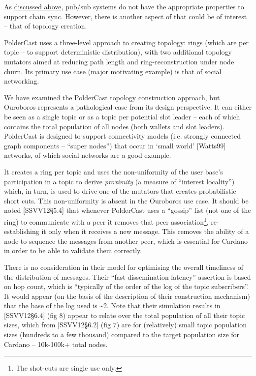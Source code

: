 \documentclass[]{article}
\begin{document}
As \protect\hyperlink{dpbtiakzv0oy}{{discussed above}}, pub/sub systems
do not have the appropriate properties to support chain sync. However,
there is another aspect of that could be of interest -- that of topology
creation.

PolderCast uses a three-level approach to creating topology: rings
(which are per topic -- to support deterministic distribution), with two
additional topology mutators aimed at reducing path length and
ring-reconstruction under node churn. Its primary use case (major
motivating example) is that of social networking.

We have examined the PolderCast topology construction approach, but
Ouroboros represents a pathological case from its design perspective. It
can either be seen as a single topic or as a topic per potential slot
leader -- each of which contains the total population of all nodes (both
wallets and slot leaders). PolderCast is designed to support
connectivity models (i.e. strongly connected graph components -- ``super
nodes'') that occur in `small world' {[}Watts99{]} networks, of which
social networks are a good example.

It creates a ring per topic and uses the non-uniformity of the user
base's participation in a topic to derive \emph{proximity} (a measure of
``interest locality'') which, in turn, is used to drive one of the
mutators that creates probabilistic short cuts. This non-uniformity is
absent in the Ouroboros use case. It should be noted {[}SSVV12§5.4{]}
that whenever PolderCast uses a ``gossip'' list (not one of the ring) to
communicate with a peer it removes that peer association\footnote{The
  shot-cuts are single use only.}, re-establishing it only when it
receives a new message. This removes the ability of a node to sequence
the messages from another peer, which is essential for Cardano in order
to be able to validate them correctly.

There is no consideration in their model for optimising the overall
timeliness of the distribution of messages. Their ``fast dissemination
latency'' assertion is based on hop count, which is ``typically of the
order of the log of the topic subscribers''. It would appear (on the
basis of the description of their construction mechanism) that the base
of the log used is \textasciitilde{}2. Note that their simulation
results in {[}SSVV12§6.4{]} (fig 8) appear to relate over the total
population of all their topic sizes, which from {[}SSVV12§6.2{]} (fig 7)
are for (relatively) small topic population sizes (hundreds to a few
thousand) compared to the target population size for Cardano --
10k-100k+ total nodes.
\end{document}
